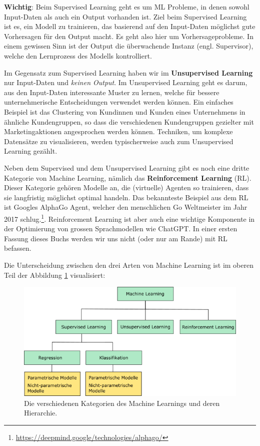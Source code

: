 \documentclass[
]{book}
\begin{document}
\textbf{Wichtig}: Beim Supervised Learning geht es um ML Probleme, in denen sowohl Input-Daten als auch ein Output vorhanden ist. Ziel beim Supervised Learning ist es, ein Modell zu trainieren, das basierend auf den Input-Daten möglichst gute Vorhersagen für den Output macht. Es geht also hier um Vorhersageprobleme. In einem gewissen Sinn ist der Output die überwachende Instanz (engl. Supervisor), welche den Lernprozess des Modells kontrolliert.

Im Gegensatz zum Supervised Learning haben wir im \textbf{Unsupervised Learning} nur Input-Daten und \emph{keinen Output}. Im Unsupervised Learning geht es darum, aus den Input-Daten interessante Muster zu lernen, welche für bessere unternehmerische Entscheidungen verwendet werden können. Ein einfaches Beispiel ist das Clustering von Kundinnen und Kunden eines Unternehmens in ähnliche Kundengruppen, so dass die verschiedenen Kundengruppen gezielter mit Marketingaktionen angesprochen werden können. Techniken, um komplexe Datensätze zu visualisieren, werden typischerweise auch zum Unsupervised Learning gezählt.

Neben dem Supervised und dem Unsupervised Learning gibt es noch eine dritte Kategorie von Machine Learning, nämlich das \textbf{Reinforcement Learning} (RL). Dieser Kategorie gehören Modelle an, die (virtuelle) Agenten so trainieren, dass sie langfristig möglichst optimal handeln. Das bekannteste Beispiel aus dem RL ist Googles AlphaGo Agent, welcher den menschlichen Go Weltmeister im Jahr 2017 schlug.\footnote{\url{https://deepmind.google/technologies/alphago/}}. Reinforcement Learning ist aber auch eine wichtige Komponente in der Optimierung von grossen Sprachmodellen wie ChatGPT. In einer ersten Fassung dieses Buchs werden wir uns nicht (oder nur am Rande) mit RL befassen.

Die Unterscheidung zwischen den drei Arten von Machine Learning ist im oberen Teil der Abbildung \ref{fig:slulrl} visualisiert:

\begin{figure}

{\centering \includegraphics[width=0.9\linewidth]{images/SL_UL_RL} 

}

\caption{Die verschiedenen Kategorien des Machine Learnings und deren Hierarchie. }\label{fig:slulrl}
\end{figure}
\end{document}
